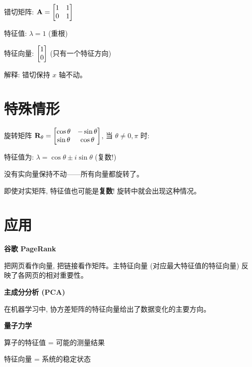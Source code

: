 \begin{example}
错切矩阵: $\mathbf{A} = \begin{bmatrix} 1 & 1 \\ 0 & 1 \end{bmatrix}$

特征值: $\lambda = 1$ (重根)

特征向量: $\begin{bmatrix} 1 \\ 0 \end{bmatrix}$ (只有一个特征方向)

解释: 错切保持 $x$ 轴不动。
\end{example}

\section{特殊情形}

\begin{theorem}[二维旋转]
旋转矩阵 $\mathbf{R}_\theta = \begin{bmatrix} \cos\theta & -\sin\theta \\ \sin\theta & \cos\theta \end{bmatrix}$, 当 $\theta \neq 0, \pi$ 时:

特征值为: $\lambda = \cos\theta \pm i\sin\theta$ (复数!)

没有实向量保持不动——所有向量都旋转了。
\end{theorem}

\begin{warning}
即使对实矩阵, 特征值也可能是\textbf{复数}! 旋转中就会出现这种情况。
\end{warning}

\section{应用}

\begin{practical}
\textbf{谷歌 PageRank}

把网页看作向量, 把链接看作矩阵。主特征向量 (对应最大特征值的特征向量) 反映了各网页的相对重要性。
\end{practical}

\begin{practical}
\textbf{主成分分析 (PCA)}

在机器学习中, 协方差矩阵的特征向量给出了数据变化的主要方向。
\end{practical}

\begin{practical}
\textbf{量子力学}

算子的特征值 = 可能的测量结果

特征向量 = 系统的稳定状态
\end{practical}

